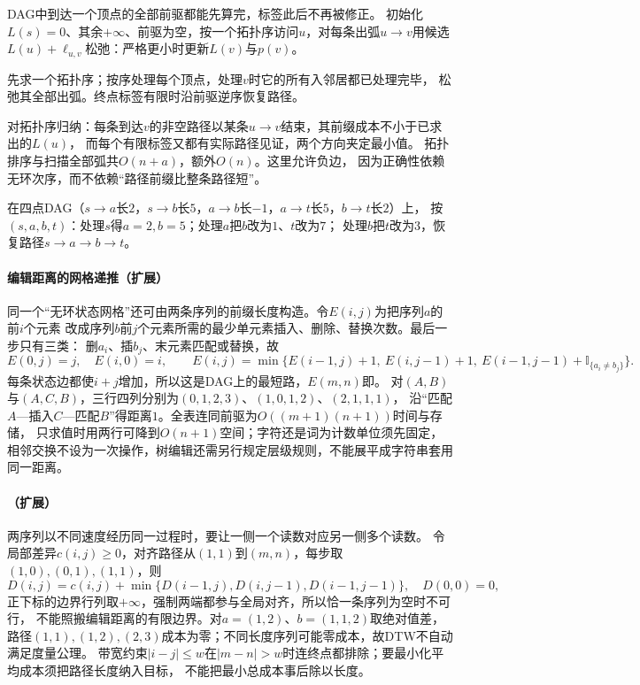 DAG中到达一个顶点的全部前驱都能先算完，标签此后不再被修正。
初始化$L(s)=0$、其余$+\infty$、前驱为空，按一个拓扑序访问$u$，对每条出弧$u\to v$用候选
$L(u)+\ell_{u,v}$松弛：严格更小时更新$L(v)$与$p(v)$。
\begin{algorithm}[DAG拓扑递推最短路]
  先求一个拓扑序；按序处理每个顶点，处理$v$时它的所有入邻居都已处理完毕，
  松弛其全部出弧。终点标签有限时沿前驱逆序恢复路径。
\end{algorithm}
对拓扑序归纳：每条到达$v$的非空路径以某条$u\to v$结束，其前缀成本不小于已求出的$L(u)$，
而每个有限标签又都有实际路径见证，两个方向夹定最小值。
拓扑排序与扫描全部弧共$O(n+a)$，额外$O(n)$。这里允许负边，
因为正确性依赖无环次序，而不依赖“路径前缀比整条路径短”。

在四点DAG（$s\to a$长$2$，$s\to b$长$5$，$a\to b$长$-1$，$a\to t$长$5$，$b\to t$长$2$）上，
按$(s,a,b,t)$：处理$s$得$a=2,b=5$；处理$a$把$b$改为$1$、$t$改为$7$；
处理$b$把$t$改为$3$，恢复路径$s\to a\to b\to t$。

\paragraph{编辑距离的网格递推（扩展）}
同一个“无环状态网格”还可由两条序列的前缀长度构造。令$E(i,j)$为把序列$a$的前$i$个元素
改成序列$b$前$j$个元素所需的最少单元素插入、删除、替换次数。最后一步只有三类：
删$a_i$、插$b_j$、末元素匹配或替换，故
\begin{equation}
  E(0,j)=j,\quad E(i,0)=i,\qquad
  E(i,j)=\min\bigl\{E(i-1,j)+1,\ E(i,j-1)+1,\
    E(i-1,j-1)+\mathbb I_{\{a_i\neq b_j\}}\bigr\}.
  \label{eq:graph-edit-distance-recursion}
\end{equation}
每条状态边都使$i+j$增加，所以这是DAG上的最短路，$E(m,n)$即。
对$(A,B)$与$(A,C,B)$，三行四列分别为$(0,1,2,3)$、$(1,0,1,2)$、$(2,1,1,1)$，
沿“匹配$A$—插入$C$—匹配$B$”得距离$1$。全表连同前驱为$O((m+1)(n+1))$时间与存储，
只求值时用两行可降到$O(n+1)$空间；字符还是词为计数单位须先固定，
相邻交换不设为一次操作，树编辑还需另行规定层级规则，不能展平成字符串套用同一距离。

\paragraph{（扩展）}
两序列以不同速度经历同一过程时，要让一侧一个读数对应另一侧多个读数。
令局部差异$c(i,j)\geq0$，对齐路径从$(1,1)$到$(m,n)$，每步取$(1,0),(0,1),(1,1)$，则
\begin{equation}
  D(i,j)=c(i,j)+\min\{D(i-1,j),D(i,j-1),D(i-1,j-1)\},\quad D(0,0)=0,
  \label{eq:graph-dtw-recursion}
\end{equation}
正下标的边界行列取$+\infty$，强制两端都参与全局对齐，所以恰一条序列为空时不可行，
不能照搬编辑距离的有限边界。对$a=(1,2)$、$b=(1,1,2)$取绝对值差，
路径$(1,1),(1,2),(2,3)$成本为零；不同长度序列可能零成本，故DTW不自动满足度量公理。
带宽约束$|i-j|\leq w$在$|m-n|>w$时连终点都排除；要最小化平均成本须把路径长度纳入目标，
不能把最小总成本事后除以长度。

